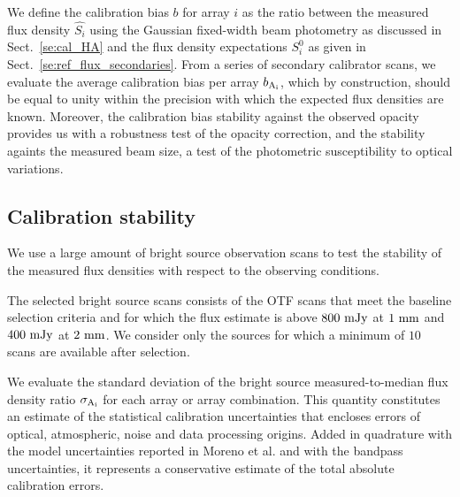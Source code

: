 We define the calibration bias $b$ for array $i$ as
the ratio between the measured flux density $\hat{S_{i}}$ using the
Gaussian fixed-width beam photometry as discussed in
Sect.~\ref{se:cal_HA} and the flux density expectations $S^{0}_{i}$ as
given in Sect.~\ref{se:ref_flux_secondaries}. From a series of
secondary calibrator scans, we evaluate the average calibration bias
per array $b_{\rm A_i}$, which by construction, should be equal to
unity within the precision with which the expected flux densities are
known. Moreover, the calibration bias stability against the observed
opacity provides us with a robustness test of the opacity correction,
and the stability againts the measured beam size, a test of the
photometric susceptibility to optical variations.

\subsection{Calibration stability}

We use a large amount of bright source observation scans to test the
stability of the measured flux densities with respect to the observing
conditions.

The selected bright source scans consists of the OTF scans that meet
the baseline selection criteria and for which the flux estimate is
above $800~\rm{mJy}$ at $1~\rm{mm}$ and $400~\rm{mJy}$ at
$2~\rm{mm}$. We consider only the sources for which a minimum of $10$
scans are available after selection.  

We evaluate the standard deviation of the bright source measured-to-median flux
density ratio $\sigma_{\rm A_i}$ for each array or array combination. 
This quantity constitutes an estimate of the statistical calibration
uncertainties that encloses errors of optical, atmospheric, noise and
data processing origins.
Added in quadrature with the model uncertainties reported in
Moreno et al. and with the bandpass uncertainties, it represents a
conservative estimate of the total absolute calibration errors.
